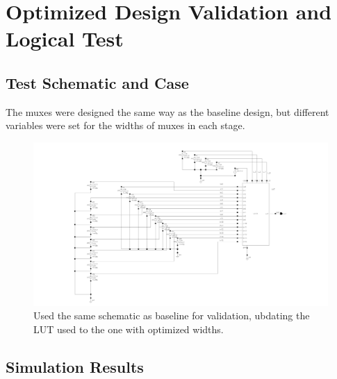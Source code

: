 \documentclass[12pt]{article}
\begin{document}
\newpage

\section{Optimized Design Validation and Logical Test}
\subsection{Test Schematic and Case}
The muxes were designed the same way as the baseline design, but different variables were set for the widths of muxes in each stage. 

\begin{figure}[H]
    \centering
    \includegraphics[width=\linewidth]{writeup//figures/optimized_LUT_validation_testschem.png}
    \caption{Used the same schematic as baseline for validation, ubdating the LUT used to the one with optimized widths.}
\end{figure}



\newpage

\subsection{Simulation Results}
\end{document}
